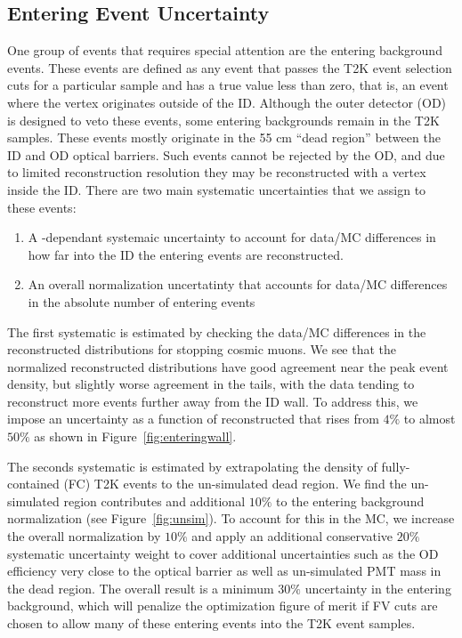 \subsection{Entering Event Uncertainty}
\label{subsec:entering}

One group of events that requires special attention are the entering background
events.  These events are defined as any event that passes
the T2K event selection cuts for a particular sample and has a true \wall
value less than zero, that is, an event where the vertex originates outside of
the ID\@.  Although the outer detector (OD) is designed to veto these events,
some entering backgrounds remain in the T2K samples.  These events mostly
originate in the 55 cm ``dead region'' between the ID and OD optical barriers.
Such events cannot be rejected by the OD, and due to limited reconstruction
resolution they may be reconstructed with a vertex inside the ID\@.  
There are two main systematic uncertainties that we assign to these events:

\begin{enumerate}
  \item A \wall-dependant systemaic uncertainty to account for data/MC differences in 
    how far into the ID the entering events are reconstructed.
  \item An overall normalization uncertatinty that accounts for data/MC
    differences in the absolute number of entering events
\end{enumerate}

The first systematic is estimated by checking the data/MC differences in the
reconstructed \wall distributions for stopping cosmic muons. We see that the
normalized reconstructed \wall distributions have good agreement near the peak
event density, but slightly worse agreement in the tails, with the data tending
to reconstruct more events further away from the ID wall.  To address this, we
impose an uncertainty as a function of reconstructed \wall that rises from
$4\%$ to almost $50\%$ as shown in Figure~\ref{fig:enteringwall}.

The seconds systematic is estimated by extrapolating the density of
fully-contained (FC) T2K events to the un-simulated dead region.  We find the
un-simulated region contributes and additional $10\%$ to the entering
background normalization (see Figure~\ref{fig:unsim}).  To account for
this in the MC, we increase the overall normalization by $10\%$ and apply an
additional conservative $20\%$ systematic uncertainty weight to cover
additional uncertainties such as the OD efficiency very close to the optical barrier
as well as un-simulated PMT mass in the dead region.  The overall result is a
minimum $30\%$ uncertainty in the entering background, which will penalize the
optimization figure of merit if FV cuts are chosen to allow many of these
entering events into the T2K event samples.

